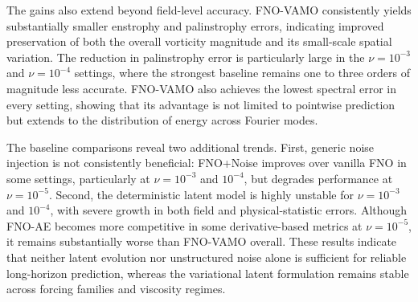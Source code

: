 \documentclass[11pt]{article}
\begin{document}
The gains also extend beyond field-level accuracy. FNO-VAMO consistently yields substantially smaller enstrophy and palinstrophy errors, indicating improved preservation of both the overall vorticity magnitude and its small-scale spatial variation. The reduction in palinstrophy error is particularly large in the $\nu=10^{-3}$ and $\nu=10^{-4}$ settings, where the strongest baseline remains one to three orders of magnitude less accurate. FNO-VAMO also achieves the lowest spectral error in every setting, showing that its advantage is not limited to pointwise prediction but extends to the distribution of energy across Fourier modes.

The baseline comparisons reveal two additional trends. First, generic noise injection is not consistently beneficial: FNO+Noise improves over vanilla FNO in some settings, particularly at $\nu=10^{-3}$ and $10^{-4}$, but degrades performance at $\nu=10^{-5}$. Second, the deterministic latent model is highly unstable for $\nu=10^{-3}$ and $10^{-4}$, with severe growth in both field and physical-statistic errors. Although FNO-AE becomes more competitive in some derivative-based metrics at $\nu=10^{-5}$, it remains substantially worse than FNO-VAMO overall. These results indicate that neither latent evolution nor unstructured noise alone is sufficient for reliable long-horizon prediction, whereas the variational latent formulation remains stable across forcing families and viscosity regimes.
\end{document}
